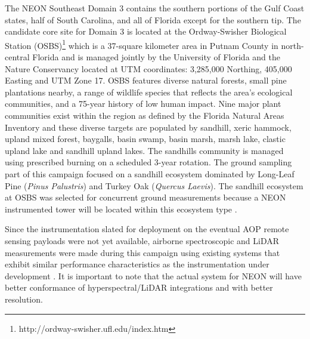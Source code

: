 \documentclass[remotesensing,article,accept,moreauthors,pdftex,12pt,a4paper]{mdpi}
\begin{document}
The NEON Southeast Domain 3 contains the southern portions of the Gulf Coast states, half of South Carolina, and all of Florida except for the southern tip. The candidate core site for Domain 3 is located at the Ordway-Swisher Biological Station (OSBS)\footnote{http://ordway-swisher.ufl.edu/index.htm} which is a 37-square kilometer area in Putnam County in north-central Florida and is managed jointly by the University of Florida and the Nature Conservancy located at UTM coordinates: 3,285,000 Northing, 405,000 Easting and UTM Zone 17. OSBS features diverse natural forests, small pine plantations nearby, a range of wildlife species that reflects the area's ecological communities, and a 75-year history of low human impact.  Nine major plant communities exist within the region as defined by the Florida Natural Areas Inventory and these diverse targets are populated by sandhill, xeric hammock, upland mixed forest, baygalls, basin swamp, basin marsh, marsh lake, clastic upland lake and sandhill upland lakes. The sandhills community is managed using prescribed burning on a scheduled 3-year rotation. The ground sampling part of this campaign focused on a sandhill ecosystem dominated by Long-Leaf Pine (\textit{Pinus Palustris}) and Turkey Oak (\textit{Quercus Laevis}). The sandhill ecosystem at OSBS was selected for concurrent ground measurements because a NEON instrumented tower will be located within this ecosystem type \cite{neon2010aopdatarelease, kampea2010aop}.

Since the instrumentation slated for deployment on the eventual AOP remote sensing payloads were not yet available, airborne spectroscopic and LiDAR measurements were made during this campaign using existing systems that exhibit similar performance characteristics as the instrumentation under development \cite{kampea2010aop}. It is important to note that the actual system for NEON will have better conformance of hyperspectral/LiDAR integrations and with better resolution.
\end{document}
